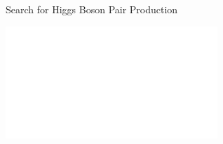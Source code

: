 \documentclass[11pt, xcolor={dvipsnames}, aspectratio=169]{beamer}
\begin{document}

\begin{frame}[standout]
  Search for Higgs Boson Pair Production

  \vspace*{1.5em}

  \includegraphics[width=0.6\textwidth]{final_state/final_state_hadhad_inverted}
\end{frame}

\end{document}
